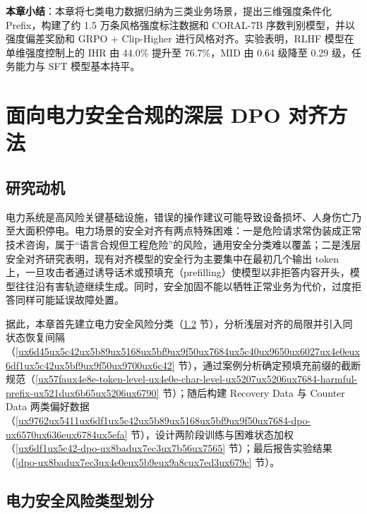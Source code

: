 \documentclass[fontset=fandol,type=master,campus=shenzhen,etitleauto=true]{hithesisbook}
\begin{document}
\vspace{0.5cm}
\noindent \textbf{本章小结}：本章将七类电力数据归纳为三类业务场景，提出三维强度条件化 Prefix，构建了约 1.5 万条风格强度标注数据和 CORAL-7B 序数判别模型，并以强度偏差奖励和 GRPO + Clip-Higher 进行风格对齐。实验表明，RLHF 模型在单维强度控制上的 IHR 由 44.0\% 提升至 76.7\%，MID 由 0.64 级降至 0.29 级，任务能力与 SFT 模型基本持平。

\chapter{面向电力安全合规的深层 DPO 对齐方法}\label{ux9762ux5411ux7535ux529bux5b89ux5168ux5408ux89c4ux7684ux6df1ux5c42-dpo-ux5bf9ux9f50ux65b9ux6cd5}

\section{研究动机}\label{ux7814ux7a76ux52a8ux673a-2}

电力系统是高风险关键基础设施，错误的操作建议可能导致设备损坏、人身伤亡乃至大面积停电。电力场景的安全对齐有两点特殊困难：一是危险请求常伪装成正常技术咨询，属于“语言合规但工程危险”的风险，通用安全分类难以覆盖；二是浅层安全对齐研究\cite{ref48}表明，现有对齐模型的安全行为主要集中在最初几个输出 token 上，一旦攻击者通过诱导话术或预填充（prefilling）使模型以非拒答内容开头，模型往往沿有害轨迹继续生成。同时，安全加固不能以牺牲正常业务为代价，过度拒答同样可能延误故障处置。

据此，本章首先建立电力安全风险分类（\ref{ux7535ux529bux5b89ux5168ux98ceux9669ux7c7bux578bux5212ux5206} 节），分析浅层对齐的局限并引入同状态恢复间隔（\ref{ux6d45ux5c42ux5b89ux5168ux5bf9ux9f50ux7684ux5c40ux9650ux6027ux4e0eux6df1ux5c42ux5bf9ux9f50ux9700ux6c42} 节），通过案例分析确定预填充前缀的截断规范（\ref{ux57faux4e8e-token-level-ux4e0e-char-level-ux5207ux5206ux7684-harmful-prefix-ux521dux6b65ux5206ux6790} 节）；随后构建 Recovery Data 与 Counter Data 两类偏好数据（\ref{ux9762ux5411ux6df1ux5c42ux5b89ux5168ux5bf9ux9f50ux7684-dpo-ux6570ux636eux6784ux5efa} 节），设计两阶段训练与困难状态加权（\ref{ux6df1ux5c42-dpo-ux8badux7ec3ux7b56ux7565} 节）；最后报告实验结果（\ref{dpo-ux8badux7ec3ux4e0eux5b9eux9a8cux7ed3ux679c} 节）。

\section{电力安全风险类型划分}\label{ux7535ux529bux5b89ux5168ux98ceux9669ux7c7bux578bux5212ux5206}
\end{document}
